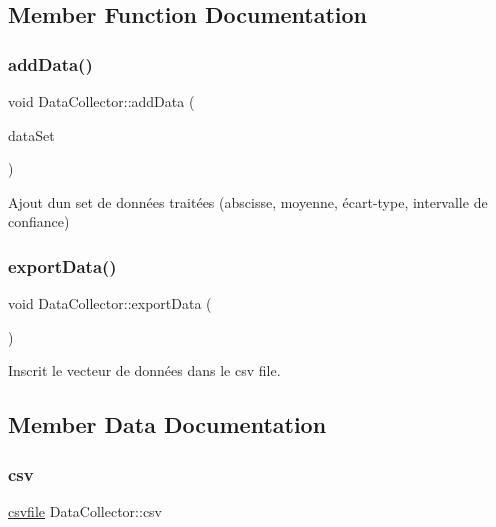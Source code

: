 \subsection{Member Function Documentation}
\mbox{\label{classDataCollector_ac0d50d38e3a5107541f929d4ea3a8cb5}} 
\subsubsection{\texorpdfstring{add\+Data()}{addData()}}
{\footnotesize\ttfamily void Data\+Collector\+::add\+Data (\begin{DoxyParamCaption}\item[{\hyperlink{classDataSet}{Data\+Set}}]{data\+Set }\end{DoxyParamCaption})}



Ajout d\textquotesingle{}un set de données traitées (abscisse, moyenne, écart-\/type, intervalle de confiance) 

\mbox{\label{classDataCollector_a6af99e22f24d045d607cb708866b9ce2}} 
\subsubsection{\texorpdfstring{export\+Data()}{exportData()}}
{\footnotesize\ttfamily void Data\+Collector\+::export\+Data (\begin{DoxyParamCaption}{ }\end{DoxyParamCaption})}



Inscrit le vecteur de données dans le csv file. 



\subsection{Member Data Documentation}
\mbox{\label{classDataCollector_a8150de03c388af2d36cfb8f15cd28189}} 
\subsubsection{\texorpdfstring{csv}{csv}}
{\footnotesize\ttfamily \hyperlink{classcsvfile}{csvfile} Data\+Collector\+::csv\hspace{0.3cm}{\ttfamily [private]}}

